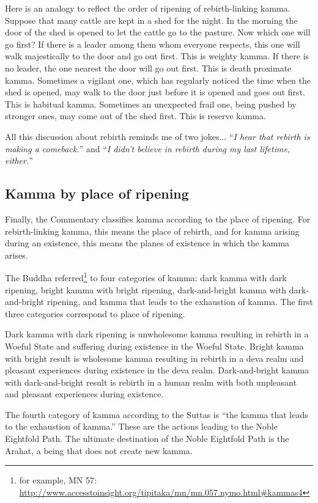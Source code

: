 Here is an analogy to reflect the order of ripening of rebirth-linking kamma. Suppose that many cattle are kept in a shed for the night. In the morning the door of the shed is opened to let the cattle go to the pasture. Now which one will go first? If there is a leader among them whom everyone respects, this one will walk majestically to the door and go out first. This is weighty kamma. If there is no leader, the one nearest the door will go out first. This is death proximate kamma. Sometimes a vigilant one, which has regularly noticed the time when the shed is opened, may walk to the door just before it is opened and goes out first. This is habitual kamma. Sometimes an unexpected frail one, being pushed by stronger ones, may come out of the shed first. This is reserve kamma.

All this discussion about rebirth reminds me of two jokes... “\textit{I hear that rebirth is making a comeback.}” and “\textit{I didn’t believe in rebirth during my last lifetime, either.}”

\subsection*{Kamma by place of ripening}

Finally, the Commentary classifies kamma according to the place of ripening. For rebirth-linking kamma, this means the place of rebirth, and for kamma arising during an existence, this means the planes of existence in which the kamma arises.

The Buddha referred\footnote{for example, MN 57: \url{http://www.accesstoinsight.org/tipitaka/mn/mn.057.nymo.html\#kammas4}} to four categories of kamma: dark kamma with dark ripening, bright kamma with bright ripening, dark-and-bright kamma with dark-and-bright ripening, and kamma that leads to the exhaustion of kamma. The first three categories correspond to place of ripening.

Dark kamma with dark ripening is unwholesome kamma resulting in rebirth in a Woeful State and suffering during existence in the Woeful State. Bright kamma with bright result is wholesome kamma resulting in rebirth in a deva realm and pleasant experiences during existence in the deva realm. Dark-and-bright kamma with dark-and-bright result is rebirth in a human realm with both unpleasant and pleasant experiences during existence. 

The fourth category of kamma according to the Suttas is “the kamma that leads to the exhaustion of kamma.” These are the actions leading to the Noble Eightfold Path. The ultimate destination of the Noble Eightfold Path is the Arahat, a being that does not create new kamma.

